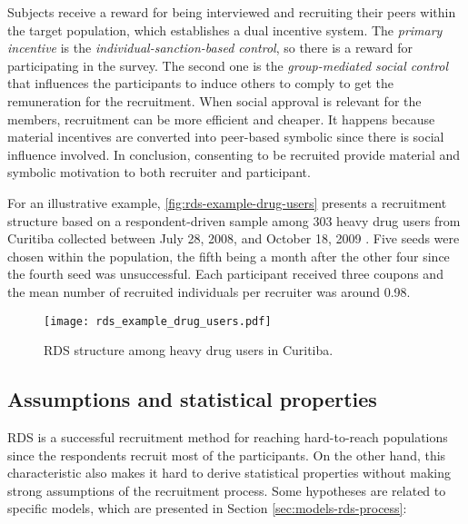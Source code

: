 Subjects receive a reward for being interviewed and recruiting their peers
within the target population, which establishes a dual incentive system. The
{\em primary incentive} is the {\em individual-sanction-based control}, so there is a
reward for participating in the survey. The second one is the {\em
group-mediated social control} that influences the participants to induce
others to comply to get the remuneration for the recruitment. When social
approval is relevant for the members, recruitment can be more efficient and
cheaper. It happens because material incentives are converted into peer-based symbolic since there is
social influence involved. In conclusion, consenting to be recruited provide
material and symbolic motivation to both recruiter and participant. 

For an illustrative example, \autoref{fig:rds-example-drug-users} presents a recruitment structure
based on a respondent-driven sample among 303 heavy drug users from
Curitiba collected between July 28, 2008, and October 18, 2009  
\cite[Web Appendix]{salganik2011assessing}. Five seeds were chosen within the
population, the fifth being a month after the other four since the fourth seed was
unsuccessful. Each participant received three coupons and the mean number of
recruited individuals per recruiter was around 0.98. 

\begin{figure}
  \centering
  \caption{\label{fig:rds-example-drug-users}RDS structure among heavy drug users
  in Curitiba.}
  \texttt{[image: rds\_example\_drug\_users.pdf]}
\end{figure}

\subsection{Assumptions and statistical properties}

RDS is a successful recruitment method for reaching hard-to-reach populations
since the respondents recruit most of the participants. On the other hand,
this characteristic also makes it hard to derive statistical properties
without making strong assumptions of the recruitment process.  Some hypotheses
are related to specific models, which are presented in Section
\ref{sec:models-rds-process}:   

